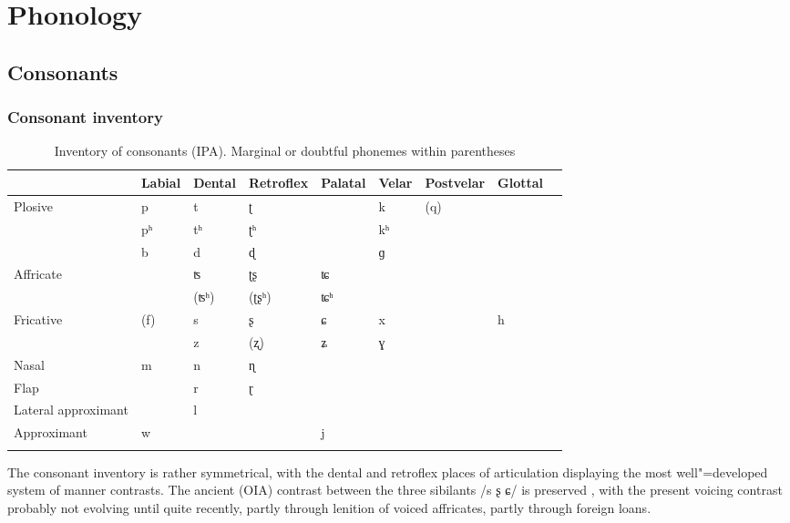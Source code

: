 \chapter{Phonology}
\label{chap:3}

\section{Consonants}
\label{sec:3-1}

\subsection{Consonant inventory}

\begin{table}[ht]
\caption{Inventory of consonants (IPA). Marginal or doubtful phonemes within parentheses}
\begin{tabularx}{\textwidth}{ P{20mm} Q Q Q Q Q Q Q Q }
\lsptoprule
&
La\-bi\-al &
Den\-tal &
Retro\-flex &
Pa\-la\-tal &
Ve\-lar &
Post\-velar &
Glot\-tal \\\hline
Plo\-sive
&
p &
t &
ʈ &
&
k &
(q) &
\\
&
pʰ &
tʰ &
ʈʰ &
&
kʰ &
&
\\
&
b &
d &
ɖ &
&
ɡ &
&
\\
Affricate
&
&
ʦ &
ʈʂ &
ʨ &
&
&
\\
&
&
(ʦʰ) &
(ʈʂʰ) &
ʨʰ &
&
&
\\
Fricative
&
(f) &
s &
ʂ &
ɕ &
x &
&
h\\
&
&
z &
(ʐ) &
ʑ &
ɣ &
&
\\
Nasal
&
m &
n &
ɳ &
&
&
&
\\
Flap
&
&
r &
ɽ &
&
&
&
\\
Lateral approximant
&
&
l &
&
&
&
&
\\
Approximant
&
w &
&
&
j &
&
&
\\\lspbottomrule
\end{tabularx}
\label{tab:3-1}
\end{table}

The consonant inventory is rather symmetrical, with the dental and retroflex places of articulation displaying the most well"=developed system of manner contrasts. The ancient (OIA) contrast between the three sibilants /s ʂ ɕ/ is preserved \citep[442]{cardona1987}, with the present voicing contrast probably not evolving until quite recently, partly through lenition of voiced affricates, partly through foreign loans. 

